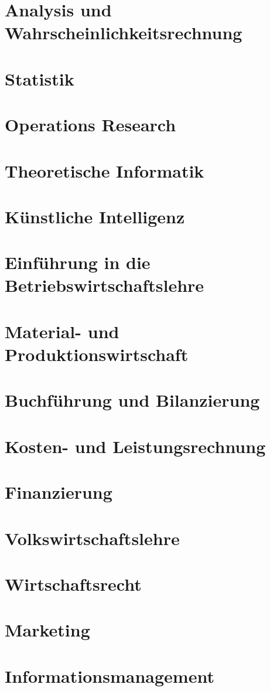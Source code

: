 \documentclass{hswbook}
\begin{document}
    \chapter{Analysis und Wahrscheinlichkeitsrechnung}
    \chapter{Statistik}
    \chapter{Operations Research}
    \chapter{Theoretische Informatik}
    \chapter{Künstliche Intelligenz}
    \chapter{Einführung in die Betriebswirtschaftslehre}
    \chapter{Material- und Produktionswirtschaft}
    \chapter{Buchführung und Bilanzierung}
    \chapter{Kosten- und Leistungsrechnung}
    \chapter{Finanzierung}
    \chapter{Volkswirtschaftslehre}
    \chapter{Wirtschaftsrecht}
    \chapter{Marketing}    
    \chapter{Informationsmanagement}
\end{document}
